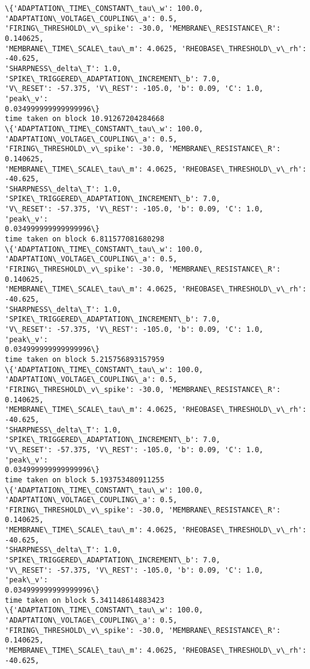     \begin{Verbatim}[commandchars=\\\{\}]
\{'ADAPTATION\_TIME\_CONSTANT\_tau\_w': 100.0, 'ADAPTATION\_VOLTAGE\_COUPLING\_a': 0.5,
'FIRING\_THRESHOLD\_v\_spike': -30.0, 'MEMBRANE\_RESISTANCE\_R': 0.140625,
'MEMBRANE\_TIME\_SCALE\_tau\_m': 4.0625, 'RHEOBASE\_THRESHOLD\_v\_rh': -40.625,
'SHARPNESS\_delta\_T': 1.0, 'SPIKE\_TRIGGERED\_ADAPTATION\_INCREMENT\_b': 7.0,
'V\_RESET': -57.375, 'V\_REST': -105.0, 'b': 0.09, 'C': 1.0, 'peak\_v':
0.034999999999999996\}
time taken on block 10.91267204284668
\{'ADAPTATION\_TIME\_CONSTANT\_tau\_w': 100.0, 'ADAPTATION\_VOLTAGE\_COUPLING\_a': 0.5,
'FIRING\_THRESHOLD\_v\_spike': -30.0, 'MEMBRANE\_RESISTANCE\_R': 0.140625,
'MEMBRANE\_TIME\_SCALE\_tau\_m': 4.0625, 'RHEOBASE\_THRESHOLD\_v\_rh': -40.625,
'SHARPNESS\_delta\_T': 1.0, 'SPIKE\_TRIGGERED\_ADAPTATION\_INCREMENT\_b': 7.0,
'V\_RESET': -57.375, 'V\_REST': -105.0, 'b': 0.09, 'C': 1.0, 'peak\_v':
0.034999999999999996\}
time taken on block 6.811577081680298
\{'ADAPTATION\_TIME\_CONSTANT\_tau\_w': 100.0, 'ADAPTATION\_VOLTAGE\_COUPLING\_a': 0.5,
'FIRING\_THRESHOLD\_v\_spike': -30.0, 'MEMBRANE\_RESISTANCE\_R': 0.140625,
'MEMBRANE\_TIME\_SCALE\_tau\_m': 4.0625, 'RHEOBASE\_THRESHOLD\_v\_rh': -40.625,
'SHARPNESS\_delta\_T': 1.0, 'SPIKE\_TRIGGERED\_ADAPTATION\_INCREMENT\_b': 7.0,
'V\_RESET': -57.375, 'V\_REST': -105.0, 'b': 0.09, 'C': 1.0, 'peak\_v':
0.034999999999999996\}
time taken on block 5.215756893157959
\{'ADAPTATION\_TIME\_CONSTANT\_tau\_w': 100.0, 'ADAPTATION\_VOLTAGE\_COUPLING\_a': 0.5,
'FIRING\_THRESHOLD\_v\_spike': -30.0, 'MEMBRANE\_RESISTANCE\_R': 0.140625,
'MEMBRANE\_TIME\_SCALE\_tau\_m': 4.0625, 'RHEOBASE\_THRESHOLD\_v\_rh': -40.625,
'SHARPNESS\_delta\_T': 1.0, 'SPIKE\_TRIGGERED\_ADAPTATION\_INCREMENT\_b': 7.0,
'V\_RESET': -57.375, 'V\_REST': -105.0, 'b': 0.09, 'C': 1.0, 'peak\_v':
0.034999999999999996\}
time taken on block 5.193753480911255
\{'ADAPTATION\_TIME\_CONSTANT\_tau\_w': 100.0, 'ADAPTATION\_VOLTAGE\_COUPLING\_a': 0.5,
'FIRING\_THRESHOLD\_v\_spike': -30.0, 'MEMBRANE\_RESISTANCE\_R': 0.140625,
'MEMBRANE\_TIME\_SCALE\_tau\_m': 4.0625, 'RHEOBASE\_THRESHOLD\_v\_rh': -40.625,
'SHARPNESS\_delta\_T': 1.0, 'SPIKE\_TRIGGERED\_ADAPTATION\_INCREMENT\_b': 7.0,
'V\_RESET': -57.375, 'V\_REST': -105.0, 'b': 0.09, 'C': 1.0, 'peak\_v':
0.034999999999999996\}
time taken on block 5.341148614883423
\{'ADAPTATION\_TIME\_CONSTANT\_tau\_w': 100.0, 'ADAPTATION\_VOLTAGE\_COUPLING\_a': 0.5,
'FIRING\_THRESHOLD\_v\_spike': -30.0, 'MEMBRANE\_RESISTANCE\_R': 0.140625,
'MEMBRANE\_TIME\_SCALE\_tau\_m': 4.0625, 'RHEOBASE\_THRESHOLD\_v\_rh': -40.625,

\end{Verbatim}
